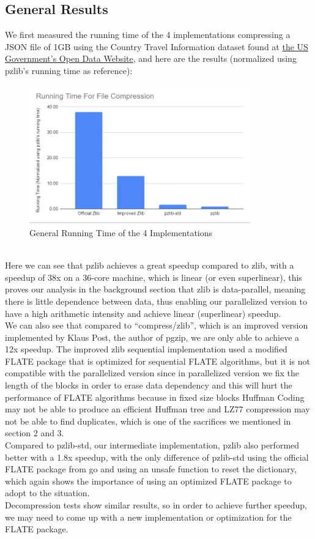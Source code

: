 \documentclass[12pt]{article}
\begin{document}
    \subsection{General Results}
    We first measured the running time of the 4 implementations compressing a JSON file of 1GB using the Country Travel Information dataset found at \href{https://catalog.data.gov/dataset/country-travel-information}{the US Government's Open Data Website}, and here are the results (normalized using pzlib's running time as reference):
    \newpage
    \begin{figure}[!h]
    \begin{center}
    \includegraphics[height=6cm]{GeneralResults.JPG}
    \caption{General Running Time of the 4 Implementations}
    \end{center}
    \end{figure}
    ~\\
    Here we can see that pzlib achieves a great speedup compared to zlib, with a speedup of 38x on a 36-core machine, which is linear (or even superlinear), this proves our analysis in the background section that zlib is data-parallel, meaning there is little dependence between data, thus enabling our parallelized version to have a high arithmetic intensity and achieve linear (superlinear) speedup.\\
    We can also see that compared to ``compress/zlib'', which is an improved version implemented by Klaus Post, the author of pgzip, we are only able to achieve a 12x speedup. The improved zlib sequential implementation used a modified FLATE package that is optimized for sequential FLATE algorithms, but it is not compatible with the parallelized version since in parallelized version we fix the length of the blocks in order to erase data dependency and this will hurt the performance of FLATE algorithms because in fixed size blocks Huffman Coding may not be able to produce an efficient Huffman tree and LZ77 compression may not be able to find duplicates, which is one of the sacrifices we mentioned in section 2 and 3.\\
    Compared to pzlib-std, our intermediate implementation, pzlib also performed better with a 1.8x speedup, with the only difference of pzlib-std using the official FLATE package from go and using an unsafe function to reset the dictionary, which again shows the importance of using an optimized FLATE package to adopt to the situation.\\
    Decompression tests show similar results, so in order to achieve further speedup, we may need to come up with a new implementation or optimization for the FLATE package.
\end{document}
